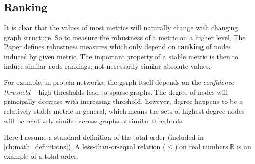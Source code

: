 \subsection{Ranking}\label{sec:ranking}

It is clear that the values of most metrics will naturally change with changing graph structure.
So to measure the robustness of a metric on a higher level, The Paper defines robustness measures which only depend on \textbf{ranking} of nodes induced by given metric.
The important property of a stable metric is then to induce similar node rankings, not necessarily similar absolute values.

For example, in protein networks, the graph itself depends on the \textsl{confidence threshold} -- high thresholds lead to sparse graphs.
The degree of nodes will principally decrease with increasing threshold, however, degree happens to be a relatively stable metric in general, which means the sets of highest-degree nodes will be relatively similar across graphs of similar thresholds.

%

Here I assume a standard definition of the total order (included in \cref{ch:math_definitions}).
A less-than-or-equal relation ($\leq$) on real numbers $\mathbb{R}$ is an example of a total order.

